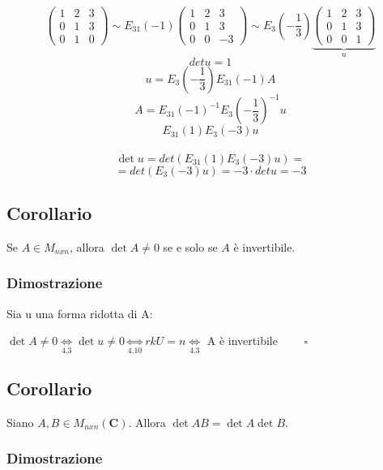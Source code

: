 \documentclass[12pt]{article}
\begin{document}
\[\begin{pmatrix}
    1 & 2 & 3\\
    0 & 1 & 3\\
    0 & 1 & 0
\end{pmatrix} \sim E_{31}(-1)
\begin{pmatrix}
    1 & 2 & 3\\
    0 & 1 & 3\\
    0 & 0 & -3
\end{pmatrix} \sim E_{3}\left(-\frac{1}{3}\right)
\underbrace{\begin{pmatrix}
    1 & 2 & 3\\
    0 & 1 & 3\\
    0 & 0 & 1
\end{pmatrix}}_u
\]
\[detu = 1\]
\[u = E_3\left(-\frac{1}{3}\right)E_{31}(-1)A\]
\[A = E_{31}(-1)^{-1}E_3\left(-\frac{1}{3}\right)^{-1}u\]
\[E_{31}(1)E_3(-3)u\]
\\
\[\det{u} = det(E_{31}(1)E_3(-3)u) =\] \[= det(E_3(-3)u) = -3 \cdot detu = -3\]

\subsection{Corollario}

Se $A \in M_{nxn}$, allora $\det{A} \neq 0$ se e solo se
$A$ è invertibile.

\subsubsection{Dimostrazione}

Sia u una forma ridotta di A:

\begin{center}
 $\det{A} \neq 0 \underset{4.3}{\Longleftrightarrow} \det{u} \neq 0 \underset{4.10}{\Longleftrightarrow} rkU = n \underset{4.3}{\Longleftrightarrow}$ A è invertibile $\quad \quad \square$
\end{center}

\subsection{Corollario}

Siano $A, B \in M_{nxn} (\mathbf{C})$. Allora $\det{AB} = \det{A}\det{B}$.

\subsubsection{Dimostrazione}
\end{document}
